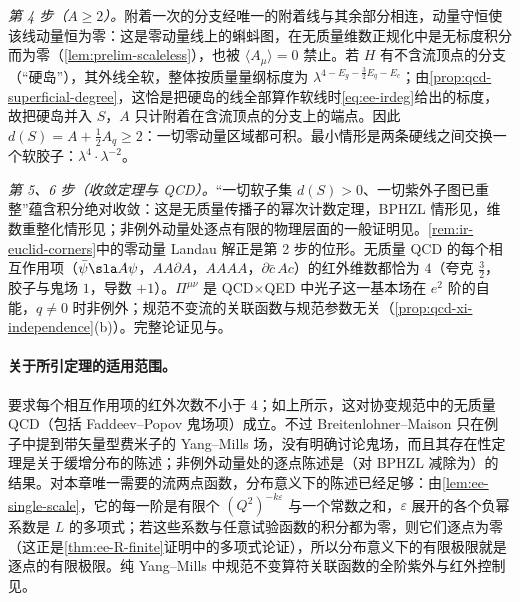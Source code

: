 \begin{proofsketch}
\emph{第 4 步（$A\ge2$）。}附着一次的分支经唯一的附着线与其余部分相连，动量守恒使该线动量恒为零：这是零动量线上的蝌蚪图，在无质量维数正规化中是无标度积分而为零（\cref{lem:prelim-scaleless}），也被 $\langle A_\mu\rangle=0$ 禁止。若 $H$ 有不含流顶点的分支（“硬岛”），其外线全软，整体按质量量纲标度为 $\lambda^{4-E_g-\frac32E_q-E_c}$；由\cref{prop:qcd-superficial-degree}，这恰是把硬岛的线全部算作软线时\cref{eq:ee-irdeg}给出的标度，故把硬岛并入 $S$，$A$ 只计附着在含流顶点的分支上的端点。因此 $d(S)=A+\frac12A_q\ge2$：一切零动量区域都可积。最小情形是两条硬线之间交换一个软胶子：$\lambda^4\cdot\lambda^{-2}$。

\emph{第 5、6 步（收敛定理与 QCD）。}“一切软子集 $d(S)>0$、一切紫外子图已重整”蕴含积分绝对收敛：这是无质量传播子的幂次计数定理，BPHZL 情形见\cite{LowensteinZimmermann1975,Lowenstein:1975ps}，维数重整化情形见\cite{Breitenlohner:1975hg,Breitenlohner:1976te}；非例外动量处逐点有限的物理层面的一般证明见\cite{PoggioQuinn1976}。\cref{rem:ir-euclid-corners}中的零动量 Landau 解正是第 2 步的位形。无质量 QCD 的每个相互作用项（$\bar\psi\sla A\psi$，$AA\partial A$，$AAAA$，$\partial\bar c\,Ac$）的红外维数都恰为 $4$（夸克 $\frac32$，胶子与鬼场 $1$，导数 $+1$）。$\Pi^{\mu\nu}$ 是 QCD$\times$QED 中光子这一基本场在 $e^2$ 阶的自能，$q\ne0$ 时非例外；规范不变流的关联函数与规范参数无关（\cref{prop:qcd-xi-independence}(b)）。完整论证见\cite{LowensteinZimmermann1975,Lowenstein:1975ps,Breitenlohner:1975hg,Breitenlohner:1976te}与\cite{PoggioQuinn1976}。
\end{proofsketch}

\paragraph{关于所引定理的适用范围。}\cite{Breitenlohner:1976te}要求每个相互作用项的红外次数不小于 $4$；如上所示，这对协变规范中的无质量 QCD（包括 Faddeev--Popov 鬼场项）成立。不过 Breitenlohner--Maison 只在例子中提到带矢量型费米子的 Yang--Mills 场，没有明确讨论鬼场，而且其存在性定理是关于缓增分布的陈述；非例外动量处的逐点陈述是\cite{PoggioQuinn1976}（对 BPHZL 减除为\cite{LowensteinZimmermann1975}）的结果。对本章唯一需要的流两点函数，分布意义下的陈述已经足够：由\cref{lem:ee-single-scale}，它的每一阶是有限个 $(Q^2)^{-k\varepsilon}$ 与一个常数之和，$\varepsilon$ 展开的各个负幂系数是 $L$ 的多项式；若这些系数与任意试验函数的积分都为零，则它们逐点为零（这正是\cref{thm:ee-R-finite}证明中的多项式论证），所以分布意义下的有限极限就是逐点的有限极限。纯 Yang--Mills 中规范不变算符关联函数的全阶紫外与红外控制见\cite{Frob:2015uqy}。

